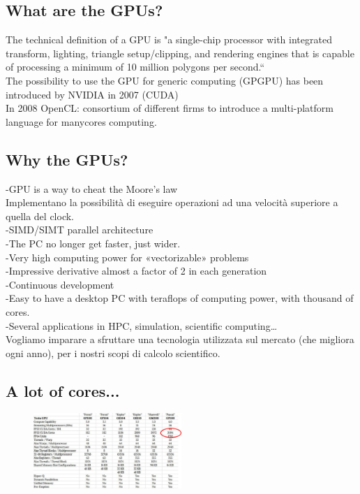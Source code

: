\subsection{What are the GPUs?}

The technical definition of a GPU is "a single-chip processor with integrated
transform, lighting, triangle setup/clipping, and rendering engines that is
capable of processing a minimum of 10 million polygons per second.“\\
The possibility to use the GPU for generic computing (GPGPU) has been
introduced by NVIDIA in 2007 (CUDA)\\
In 2008 OpenCL: consortium of different firms to introduce a multi-platform
language for manycores computing.

\subsection{Why the GPUs?}

-GPU is a way to cheat the Moore’s law\\
Implementano la possibilità di eseguire operazioni ad una velocità superiore a quella del clock.\\
-SIMD/SIMT parallel architecture\\
-The PC no longer get faster, just wider.\\
-Very high computing power for «vectorizable» problems\\
-Impressive derivative almost a factor of 2 in each generation\\
-Continuous development\\
-Easy to have a desktop PC with teraflops of computing power, with thousand of cores.\\
-Several applications in HPC, simulation, scientific computing…\\

Vogliamo imparare a sfruttare una tecnologia utilizzata sul mercato (che migliora ogni anno), per i nostri scopi di calcolo scientifico.\\

\subsection{A lot of cores...}

\begin{figure}[ht]
	\centering
	\includegraphics[width=0.5\textwidth]{figure_parallel/cores.png}\end{figure}
\FloatBarrier


